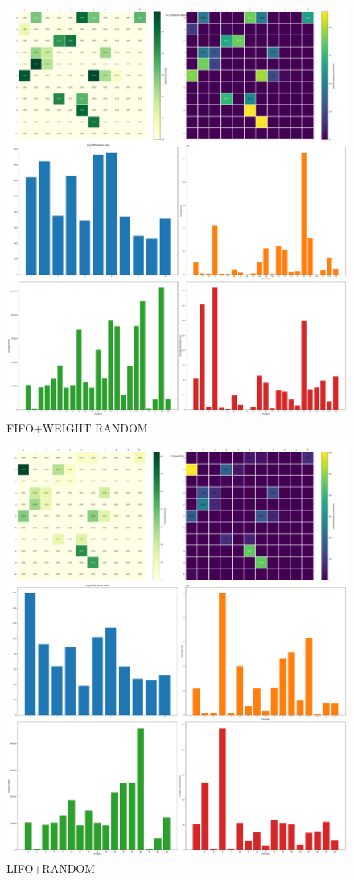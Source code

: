 \documentclass[11pt,a4paper]{article}
\begin{document}
\begin{figure}[H]
\includegraphics[width=\textwidth]{fifo_weight_random.png}
\caption{FIFO+WEIGHT RANDOM}
\end{figure}

\begin{figure}[H]
\includegraphics[width=\textwidth]{lifo_random.png}
\caption{LIFO+RANDOM}
\end{figure}
\end{document}
